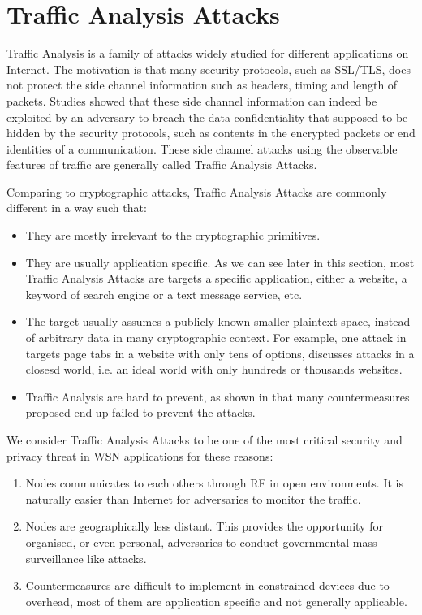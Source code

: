 
\section{Traffic Analysis Attacks} \label{Sec: Traffic Analysis Attacks}

Traffic Analysis is a family of attacks widely studied for different applications on Internet. The motivation is that many security protocols, such as SSL/TLS, does not protect the side channel information such as headers, timing and length of packets. Studies\cite{WebSideChannel}\cite{PinpointWeb}\cite{Peekaboo} showed that these side channel information can indeed be exploited by an adversary to breach the data confidentiality that supposed to be hidden by the security protocols, such as contents in the encrypted packets or end identities of a communication. These side channel attacks using the observable features of traffic are generally called Traffic Analysis Attacks.

Comparing to cryptographic attacks, Traffic Analysis Attacks are commonly different in a way such that:
\begin{itemize}
	\item They are mostly irrelevant to the cryptographic primitives. 
	\item They are usually application specific. As we can see later in this section, most Traffic Analysis Attacks are targets a specific application, either a website, a keyword of search engine or a text message service, etc.
	\item The target usually assumes a publicly known smaller plaintext space, instead of arbitrary data in many cryptographic context. For example, one attack in \cite{WebSideChannel} targets page tabs in a website with only tens of options,  \cite{Peekaboo} discusses attacks in a closesd world, i.e. an ideal world with only hundreds or thousands websites.
	\item Traffic Analysis are hard to prevent, as shown in \cite{Peekaboo} that many countermeasures proposed end up failed to prevent the attacks.
\end{itemize}

We consider Traffic Analysis Attacks to be one of the most critical security and privacy threat in WSN applications for these reasons:
\begin{enumerate}
	\item Nodes communicates to each others through RF in open environments. It is naturally easier than Internet for adversaries to monitor the traffic.
	\item Nodes are geographically less distant. This provides the opportunity for organised, or even personal, adversaries to conduct governmental mass surveillance like attacks.
	\item Countermeasures are difficult to implement in constrained devices due to overhead, most of them are application specific and not generally applicable.
\end{enumerate} 

